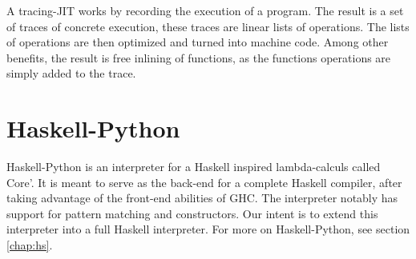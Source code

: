 A tracing-JIT works by recording the execution of a program. The result is a set of 
traces of concrete execution, these traces are linear lists of operations. The lists of
operations are then optimized and turned into machine code. Among other benefits, the
result is free inlining of functions, as the functions operations are simply added to
the trace. \cite{bolz2011runtime}

\section{Haskell-Python}

Haskell-Python\cite{haskellpython}
is an interpreter for a Haskell inspired lambda-calculs called Core'. 
It is meant to serve as the back-end for a complete Haskell compiler, after taking advantage 
of the front-end abilities of GHC. The interpreter notably has support for pattern matching 
and constructors. Our intent is to extend this interpreter into a full Haskell interpreter.
For more on Haskell-Python, see section \ref{chap:hs}.

